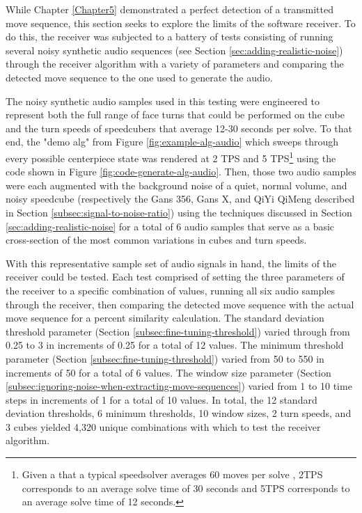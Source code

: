 While Chapter \ref{Chapter5} demonstrated a perfect detection of a
transmitted move sequence, this section seeks to explore the limits of
the software receiver. To do this, the receiver was subjected to a
battery of tests consisting of running several noisy synthetic audio
sequences (see Section \ref{sec:adding-realistic-noise}) through the
receiver algorithm with a variety of parameters and comparing the
detected move sequence to the one used to generate the audio.

The noisy synthetic audio samples used in this testing were engineered
to represent both the full range of face turns that could be performed
on the cube and the turn speeds of speedcubers that average 12-30
seconds per solve. To that end, the "demo alg" from Figure
\ref{fig:example-alg-audio} which sweeps through every possible
centerpiece state was rendered at 2 TPS and 5 TPS\footnote{Given a that
a typical speedsolver averages 60 moves per solve \cite{pochmann-hume}, 2TPS
corresponds to an average solve time of 30 seconds and 5TPS corresponds
to an average solve time of 12 seconds.} using the code shown in Figure
\ref{fig:code-generate-alg-audio}. Then, those two audio samples were
each augmented with the background noise of a quiet, normal volume, and
noisy speedcube (respectively the Gans 356, Gans X, and QiYi QiMeng
described in Section \ref{subsec:signal-to-noise-ratio}) using the
techniques discussed in Section \ref{sec:adding-realistic-noise} for a
total of 6 audio samples that serve as a basic cross-section of the
most common variations in cubes and turn speeds.

With this representative sample set of audio signals in hand, the
limits of the receiver could be tested. Each test comprised of setting
the three parameters of the receiver to a specific combination of
values, running all six audio samples through the receiver, then
comparing the detected move sequence with the actual move sequence for
a percent similarity calculation. The standard deviation threshold
parameter  (Section \ref{subsec:fine-tuning-threshold})
varied through from 0.25 to 3 in increments of 0.25 for a total of 12
values. The minimum threshold parameter  (Section
\ref{subsec:fine-tuning-threshold}) varied from 50 to 550 in increments
of 50 for a total of 6 values. The window size parameter
 (Section
\ref{subsec:ignoring-noise-when-extracting-move-sequences}) varied from
1 to 10 time steps in increments of 1 for a total of 10 values. In
total, the 12 standard deviation thresholds, 6 minimum thresholds, 10
window sizes, 2 turn speeds, and 3 cubes yielded 4,320 unique
combinations with which to test the receiver algorithm.


